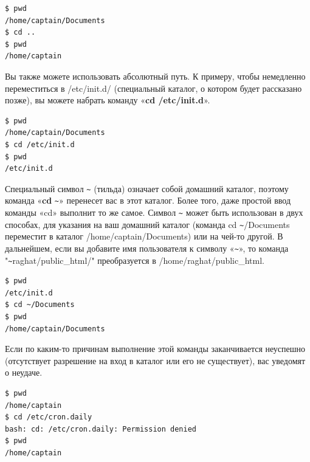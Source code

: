 \documentclass[10pt]{book}
\begin{document}
\vspace{3mm}
\begin{tcolorbox}
\begin{lstlisting}
$ pwd
/home/captain/Documents
$ cd ..
$ pwd
/home/captain
\end{lstlisting}
\end{tcolorbox}

Вы также можете использовать абсолютный путь. К примеру, чтобы немедленно переместиться в /etc/init.d/ (специальный каталог, о котором будет рассказано позже), вы можете набрать команду «\textbf{cd /etc/init.d}».

\vspace{3mm}
\begin{tcolorbox}
\begin{lstlisting}
$ pwd
/home/captain/Documents
$ cd /etc/init.d
$ pwd
/etc/init.d
\end{lstlisting}
\end{tcolorbox}

Специальный символ  \verb|~| (тильда) означает собой домашний каталог, поэтому команда «\textbf{cd} \verb|~|» перенесет вас в этот каталог.
Более того, даже простой ввод команды «cd» выполнит то же самое. 
Символ \verb|~| может быть использован в двух способах, для указания на ваш домашний каталог (команда cd \verb|~|/Documents переместит в каталог /home/captain/Documents) или на чей-то другой. 
В дальнейшем, если вы добавите имя пользователя к символу «\verb|~|», то команда "\verb|~|raghat/public\_html/"{} преобразуется в /home/raghat/public\_html.

\vspace{3mm}
\begin{tcolorbox}
\begin{lstlisting}
$ pwd
/etc/init.d
$ cd ~/Documents
$ pwd
/home/captain/Documents
\end{lstlisting}
\end{tcolorbox}

Если по каким-то причинам выполнение этой команды заканчивается неуспешно (отсутствует разрешение на вход в каталог или его не существует), вас уведомят о неудаче.

\vspace{3mm}
\begin{tcolorbox}
\begin{lstlisting}
$ pwd
/home/captain
$ cd /etc/cron.daily
bash: cd: /etc/cron.daily: Permission denied
$ pwd
/home/captain
\end{lstlisting}
\end{tcolorbox}
\end{document}
